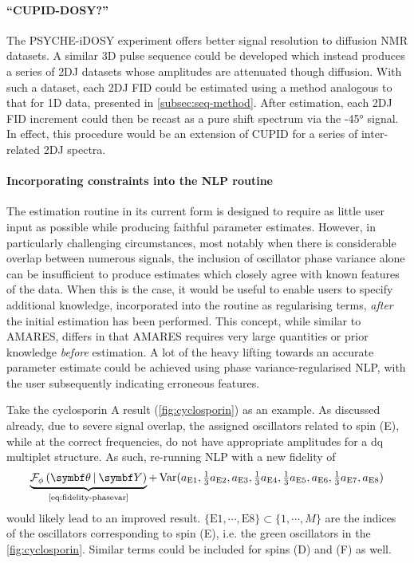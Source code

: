 \paragraph{``\ac{CUPID}-\ac{DOSY}?''}
The \ac{PSYCHE}-i\ac{DOSY} experiment offers better signal resolution to
diffusion \ac{NMR} datasets.
A similar \ac{3D} pulse sequence could be developed
which instead produces a series of \ac{2DJ} datasets whose amplitudes are
attenuated though diffusion. With such a dataset, each \ac{2DJ} \ac{FID} could
be estimated using a method analogous to that for \ac{1D} data, presented in
\cref{subsec:seq-method}. After estimation, each \ac{2DJ} \ac{FID} increment
could then be recast as a pure shift spectrum via the \ang{-45} signal. In
effect, this procedure would be an extension of \ac{CUPID} for a series of
inter-related \ac{2DJ} spectra.

\paragraph{Incorporating constraints into the \ac{NLP} routine}
The estimation routine in its current form is designed to require as little
user input as possible while producing faithful parameter estimates. However,
in particularly challenging circumstances, most notably when
there is considerable overlap between numerous signals, the inclusion of
oscillator phase variance alone can be insufficient to produce estimates which
closely agree with known features of the data. When this is the case, it would
be useful to enable users to specify additional knowledge, incorporated into
the routine as regularising terms, \emph{after} the initial estimation has been
performed. This concept, while similar to \ac{AMARES}, differs
in that \ac{AMARES} requires very large quantities or prior knowledge
\emph{before} estimation. A lot of the heavy lifting towards an accurate
parameter estimate could be achieved using phase variance-regularised \ac{NLP},
with the user subsequently indicating erroneous features.

Take the cyclosporin A result (\cref{fig:cyclosporin}) as an example. As
discussed already, due to severe signal overlap, the assigned oscillators
related to spin (E), while at the correct frequencies, do not have appropriate
amplitudes for a dq multiplet structure. As such, re-running \ac{NLP} with a
new fidelity of
\[
    \underbrace{\FphithY}_{
        \text{\cref{eq:fidelity-phasevar}}
    }+ \Var(
        a_{\text{E}1},
        \tfrac{1}{3} a_{\text{E}2},
        a_{\text{E}3},
        \tfrac{1}{3} a_{\text{E}4},
        \tfrac{1}{3} a_{\text{E}5},
        a_{\text{E}6},
        \tfrac{1}{3} a_{\text{E}7},
        a_{\text{E}8}
    )
\]
would likely lead to an improved result.
$\lbrace \text{E}1, \cdots, \text{E}8 \rbrace \subset \lbrace 1, \cdots, M \rbrace$ are the
indices of the oscillators corresponding to spin (E), i.e. the green
oscillators in the \cref{fig:cyclosporin}. Similar terms could be included
for spins (D) and (F) as well.
